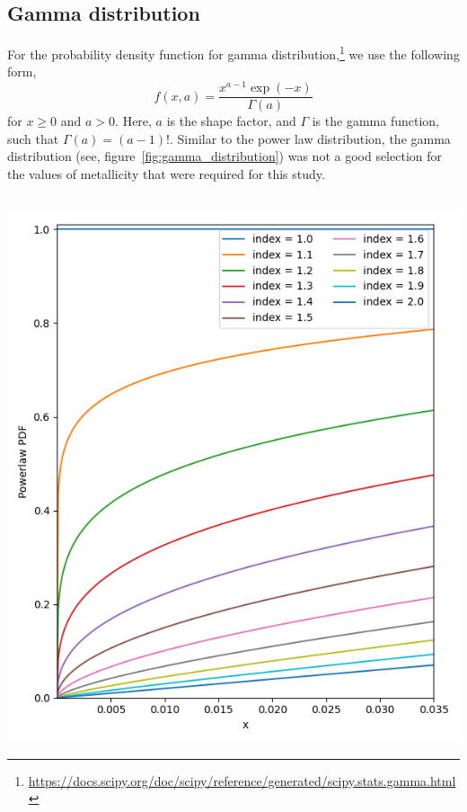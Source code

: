 \subsection{Gamma distribution}
\label{subsec:gamma-distribution}
For the probability density function for gamma distribution,\footnote{\url{https://docs.scipy.org/doc/scipy/reference/generated/scipy.stats.gamma.html}} we use the following form,
\begin{equation}
    f(x, a) = \frac{x^{a-1}\exp(-x)}{\Gamma(a)}
    \label{eq:gamma_distribution}
\end{equation}
for $x\geq 0$ and $a > 0$.
Here, $a$ is the shape factor, and $\Gamma$ is the gamma function, such that $\Gamma(a) = (a-1)!$.
Similar to the power law distribution, the gamma distribution (see, figure~\ref{fig:gamma_distribution}) was not a good selection for the values of metallicity that were required for this study.
\,\\\,\\
\begin{minipage}[l]{0.48\columnwidth}%
	\centering
	\includegraphics[width=\linewidth]{images/powerlaw}
	\label{fig:pl_distribution}
\end{minipage}
